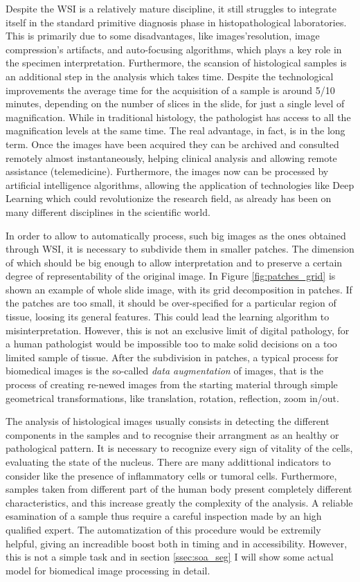 \documentclass[12pt,a4paper]{report}
\begin{document}
Despite the WSI is a relatively mature discipline, it still struggles to integrate itself in the standard primitive diagnosis phase in histopathological laboratories. This is primarily due to some disadvantages, like images'resolution, image compression's artifacts, and auto-focusing algorithms, which plays a key role in the specimen interpretation. Furthermore, the scansion of histological samples is an additional step in the analysis which takes time. Despite the technological improvements the average time for the acquisition of a sample is around 5/10 minutes, depending on the number of slices in the slide, for just a single level of magnification. While in traditional histology, the pathologist has access to all the magnification levels at the same time. The real advantage, in fact, is in the long term. Once the images have been acquired they can be archived and consulted remotely almost instantaneously, helping clinical analysis and allowing remote assistance (telemedicine). Furthermore, the images now can be processed by artificial intelligence algorithms, allowing the application of technologies like Deep Learning which could revolutionize the research field, as already has been on many different disciplines in the scientific world.

In order to allow to automatically process, such big images as the ones obtained through WSI, it is necessary to subdivide them in smaller patches. The dimension of which should be big enough to allow interpretation and to preserve a certain degree of representability of the original image. In Figure \ref{fig:patches_grid} is shown an example of whole slide image, with its grid decomposition in patches. If the patches are too small, it should be over-specified for a particular region of tissue, loosing its general features. This could lead the learning algorithm to misinterpretation. However, this is not an exclusive limit of digital pathology, for a human pathologist would be impossible too to make solid decisions on a too limited sample of tissue. After the subdivision in patches, a typical process for biomedical images is the so-called \textit{data augmentation} of images, that is the process of creating re-newed images from the starting material through simple geometrical transformations, like translation, rotation, reflection, zoom in/out.

The analysis of histological images usually consists in detecting the different components in the samples and to recognise their arrangment as an healthy or pathological pattern. It is necessary to recognize every sign of vitality of the cells, evaluating the state of the nucleus. There are many addittional indicators to consider like the presence of inflammatory cells or tumoral cells. Furthermore, samples taken from different part of the human body present completely different characteristics, and this increase greatly the complexity of the analysis.
A reliable esamination of a sample thus require a careful inspection made by an high qualified expert. The automatization of this procedure would be extremily helpful, giving an increadible boost both in timing and in accessibility. However, this is not a simple task and in section \ref{ssec:soa_seg} I will show some actual model for biomedical image processing in detail.
\end{document}

